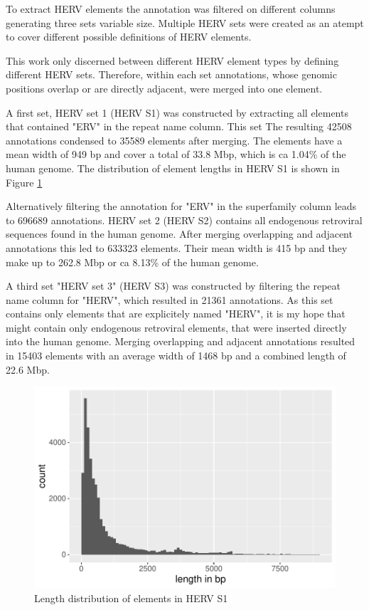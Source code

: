 \documentclass[a4paper,12pt]{article}
\begin{document}
To extract HERV elements the annotation was filtered on different columns generating three sets variable size. Multiple HERV sets were created as an atempt to cover different possible definitions of HERV elements.

This work only discerned between different HERV element types by defining different HERV sets. Therefore, within each set annotations, whose genomic positions overlap or are directly adjacent, were merged into one element.

A first set, HERV set 1 (HERV S1) was constructed by extracting all elements that contained "ERV" in the repeat name column. This set
The resulting 42508 annotations condensed to 35589 elements after merging. The elements have a mean width of 949 bp and cover a total of 33.8 Mbp, which is ca 1.04\% of the human genome. The distribution of element lengths in HERV S1 is shown in Figure \ref{fig:hervS1.lengths.hist}  

Alternatively filtering the annotation for "ERV" in the superfamily column leads to 696689 annotations. HERV set 2 (HERV S2) contains all endogenous retroviral sequences found in the human genome. After merging overlapping and adjacent annotations this led to 633323 elements. Their mean width is 415 bp and they make up to 262.8 Mbp or ca 8.13\% of the human genome. 

A third set "HERV set 3" (HERV S3) was constructed by filtering the repeat name column for "HERV", which resulted in 21361 annotations. As this set contains only elements that are explicitely named "HERV", it is my hope that might contain only endogenous retroviral elements, that were inserted directly into the human genome. Merging overlapping and adjacent annotations resulted in 15403 elements with an average width of 1468 bp and a combined length of 22.6 Mbp.

\begin{figure}[tb]
	\includegraphics[scale = 1, keepaspectratio = true]{../figures/hervS1_lengths_hist}  
	\caption{Length distribution of elements in HERV S1}
    \label{fig:hervS1.lengths.hist}
\end{figure}
\end{document}
